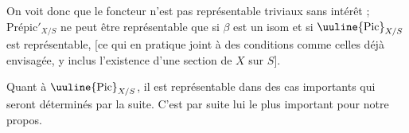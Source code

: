On voit donc que le foncteur  n'est pas représentable   triviaux sans intérêt ; $\mathrm{Prépic}'_{X/S}$ ne peut être représentable que si $\beta$ est un isom et si $\text{\uuline{Pic}}_{X/S}$ est représentable,  [ce qui en pratique joint à des conditions comme celles déjà envisagée, y inclus l'existence d'une section de $X$ sur $S$].

Quant à $\text{\uuline{Pic}}_{X/S}$, il est représentable dans des cas  importants qui seront déterminés par la suite. C'est par suite lui le plus important pour notre propos.

